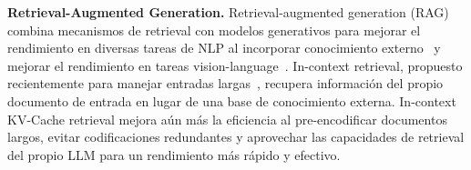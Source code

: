 \noindent\textbf{Retrieval-Augmented Generation.} 
Retrieval-augmented generation (RAG) combina mecanismos de retrieval con modelos generativos para mejorar el rendimiento en diversas tareas de NLP al incorporar conocimiento externo~\citep{guu2020retrieval,lewis2020retrieval,borgeaud2022improving} y mejorar el rendimiento en tareas vision-language~\citep{xu2024retrieval}. In-context retrieval, propuesto recientemente para manejar entradas largas~\citep{ram2023context}, recupera información del propio documento de entrada en lugar de una base de conocimiento externa. In-context KV-Cache retrieval mejora aún más la eficiencia al pre-encodificar documentos largos, evitar codificaciones redundantes y aprovechar las capacidades de retrieval del propio LLM para un rendimiento más rápido y efectivo.

